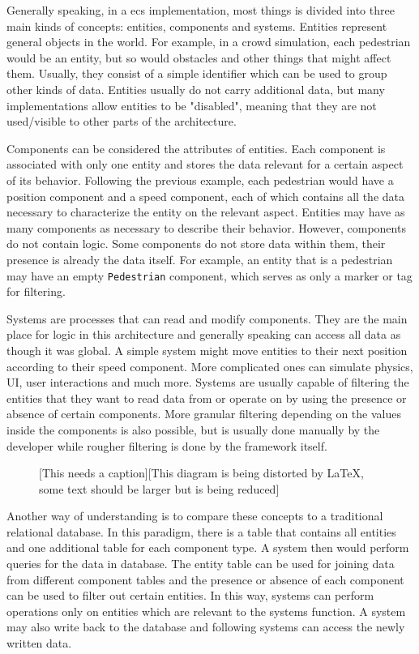 \documentclass[twoside, 11pt]{article}
\begin{document}
Generally speaking, in a \gls{ecs} implementation, most things is divided into three main kinds of concepts: entities, components and systems. Entities represent general objects in the world. For example, in a crowd simulation, each pedestrian would be an entity, but so would obstacles and other things that might affect them. Usually, they consist of a simple identifier which can be used to group other kinds of data. Entities usually do not carry additional data, but many implementations allow entities to be "disabled", meaning that they are not used/visible to other parts of the architecture.

Components can be considered the attributes of entities. Each component is associated with only one entity and stores the data relevant for a certain aspect of its behavior. Following the previous example, each pedestrian would have a position component and a speed component, each of which contains all the data necessary to characterize the entity on the relevant aspect. Entities may have as many components as necessary to describe their behavior. However, components do not contain logic. Some components do not store data within them, their presence is already the data itself. For example, an entity that is a pedestrian may have an empty \verb|Pedestrian| component, which serves as only a marker or tag for filtering.

Systems are processes that can read and modify components. They are the main place for logic in this architecture and generally speaking can access all data as though it was global. A simple system might move entities to their next position according to their speed component. More complicated ones can simulate physics, UI, user interactions and much more. Systems are usually capable of filtering the entities that they want to read data from or operate on by using the presence or absence of certain components. More granular filtering depending on the values inside the components is also possible, but is usually done manually by the developer while rougher filtering is done by the framework itself.

\begin{figure}[h]
  \centering
  
  \caption{[This needs a caption][This diagram is being distorted by \LaTeX, some text should be larger but is being reduced]}
  \label{fig:ecs_basic_example}
\end{figure}

Another way of understanding is to compare these concepts to a traditional relational database. In this paradigm, there is a table that contains all entities and one additional table for each component type. A system then would perform queries for the data in database. The entity table can be used for joining data from different component tables and the presence or absence of each component can be used to filter out certain entities. In this way, systems can perform operations only on entities which are relevant to the systems function. A system may also write back to the database and following systems can access the newly written data.
\end{document}
